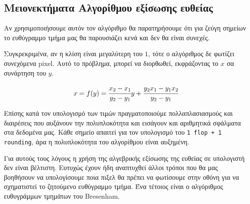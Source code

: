 \subsection{Μειονεκτήματα Αλγορίθμου εξίσωσης ευθείας}

Αν χρησιμοποιήσουμε αυτόν τον αλγόριθμο θα παρατηρήσουμε ότι για ζεύγη σημείων το ευθύγραμμο τμήμα μας θα παρουσιάζει κενά και δεν θα είναι συνεχές.

Συγκρεκριμένα, αν η κλίση είναι μεγαλύτερη του $1$, τότε ο αλγόριθμος δε φωτίζει συνεχόμενα pixel.
Αυτό το πρόβλημα, μπορεί να διορθωθεί, εκφράζοντας το $x$ σα συνάρτηση του $y$.

\[
	x = f(y) = \cfrac{x_2 - x_1}{y_2- y_1}y +  \cfrac{ y_2 x_1 - y_1 x_2  }{ y_2 - y_1 } 
\]

 Επίσης κατά τον υπολογισμό των τιμών πραγματοποιούμε πολλαπλασιασμούς και διαιρέσεις που αυξάνουν την πολυπλοκότητα και εισάγουν και αριθμητικά σφάλματα στα δεδομένα μας. Κάθε σημείο απαιτεί για τον υπολογισμό του \texttt{1 flop + 1 rounding}, άρα η πολυπλοκότητα του αλγορίθμου είναι αυξημένη.
 
 Για αυτούς τους λόγους η χρήση της αλγεβρικής εξίσωσης της ευθείας σε υπολογιστή δεν είναι βέλτιστη. Ευτυχώς έχουν ήδη αναπτυχθεί άλλοι τρόποι που θα μας βοηθήσουν να υπολογίσουμε ποια πιξελ θα πρέπει να φωτίσουμε στην οθόνη για να σχηματιστεί το ζητούμενο ευθύγραμμο τμήμα. Ένα τέτοιος είναι ο αλγόριθμος ευθυγράμμων τμημάτων του Bresenham.

